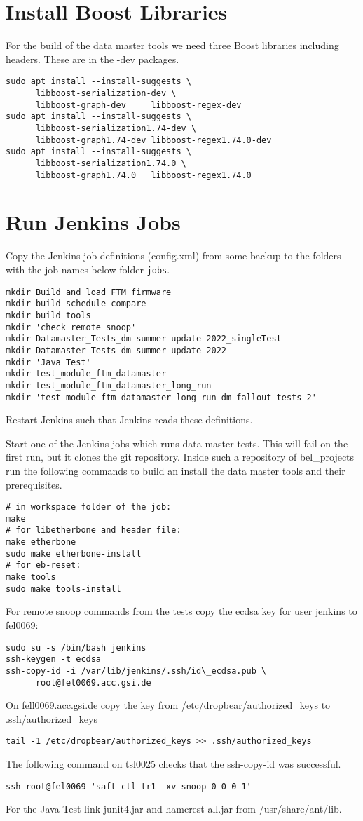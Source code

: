 \documentclass[12pt,a4paper]{report}
\begin{document}
\chapter{Install Boost Libraries}
For the build of the data master tools we need three Boost libraries including
headers. These are in the -dev packages.
\begin{verbatim}
sudo apt install --install-suggests \
      libboost-serialization-dev \
      libboost-graph-dev     libboost-regex-dev
sudo apt install --install-suggests \
      libboost-serialization1.74-dev \
      libboost-graph1.74-dev libboost-regex1.74.0-dev
sudo apt install --install-suggests \
      libboost-serialization1.74.0 \
      libboost-graph1.74.0   libboost-regex1.74.0
\end{verbatim}

\chapter{Run Jenkins Jobs}
Copy the Jenkins job definitions (config.xml) from some backup to the folders
with the job names below folder \texttt{jobs}.
\begin{verbatim}
mkdir Build_and_load_FTM_firmware
mkdir build_schedule_compare
mkdir build_tools
mkdir 'check remote snoop'
mkdir Datamaster_Tests_dm-summer-update-2022_singleTest
mkdir Datamaster_Tests_dm-summer-update-2022
mkdir 'Java Test'
mkdir test_module_ftm_datamaster
mkdir test_module_ftm_datamaster_long_run
mkdir 'test_module_ftm_datamaster_long_run dm-fallout-tests-2'
\end{verbatim}
Restart Jenkins such that
Jenkins reads these definitions.

Start one of the Jenkins jobs which runs data master tests. This will fail on the first run,
but it clones the git repository. Inside such a repository of bel\_projects run the following
commands to build an install the data master tools and their prerequisites.
\begin{verbatim}
# in workspace folder of the job:
make
# for libetherbone and header file:
make etherbone
sudo make etherbone-install
# for eb-reset:
make tools
sudo make tools-install
\end{verbatim}
For remote snoop commands from the tests copy the ecdsa key for user jenkins to fel0069:
\begin{verbatim}
sudo su -s /bin/bash jenkins
ssh-keygen -t ecdsa
ssh-copy-id -i /var/lib/jenkins/.ssh/id\_ecdsa.pub \
      root@fel0069.acc.gsi.de
\end{verbatim}
On fell0069.acc.gsi.de copy the key from /etc/dropbear/authorized\_keys to .ssh/authorized\_keys
\begin{verbatim}
tail -1 /etc/dropbear/authorized_keys >> .ssh/authorized_keys
\end{verbatim}
The following command on tsl0025 checks that the ssh-copy-id was successful.
\begin{verbatim}
ssh root@fel0069 'saft-ctl tr1 -xv snoop 0 0 0 1'
\end{verbatim}

For the Java Test link junit4.jar and hamcrest-all.jar from /usr/share/ant/lib.
\end{document}
